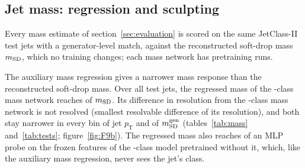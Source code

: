 
\subsection{Jet mass: regression and sculpting}\label{sec:mass}

Every mass estimate of section~\ref{sec:evaluation} is scored on the same JetClass-II test jets with a
generator-level match, against the reconstructed soft-drop mass $m_{\mathrm{SD}}$, which no training changes; each mass network
has \MlstMassNRunsWord{} pretraining runs.

The auxiliary mass regression gives a narrower mass response than the reconstructed soft-drop mass.
Over all test jets, the regressed mass of the \Kres-class mass network %
reaches \MlstMassHeadResMassOverUncorrPr{} of $m_{\mathrm{SD}}$. Its difference in resolution from the \Kcoarse-class %
mass network is not resolved (smallest resolvable difference \MlstPwHeadRes{} of its resolution), and both stay
narrower in every bin of jet $p_{\mathrm{T}}$ and of %
$m^{\mathrm{gen}}_{\mathrm{SD}}$ (tables~\ref{tab:mass} and~\ref{tab:tests}; figure~\ref{fig:F9b}). The regressed mass also reaches %
\MlstMassHeadResMassOverMlpResPr{} of an MLP probe on the frozen features of the \Kres-class
model pretrained without it, which, like the auxiliary mass regression, never sees the jet's class.

